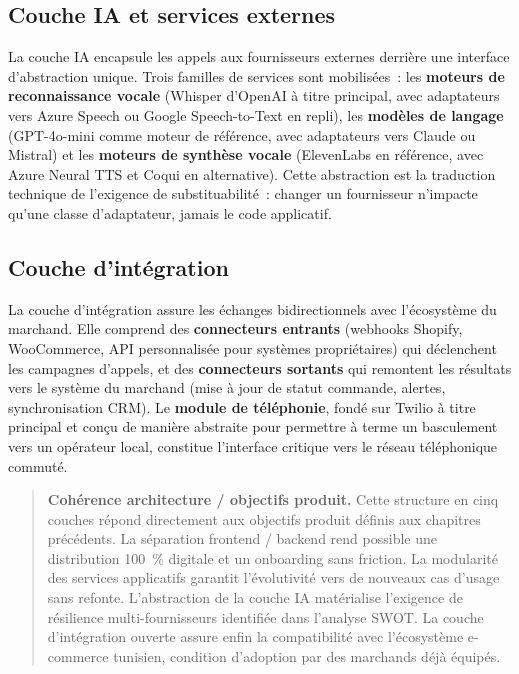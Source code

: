 \subsection{Couche IA et services externes}
\label{subsec:couche_ia_externes}

La couche IA encapsule les appels aux fournisseurs externes derrière une interface d'abstraction unique. Trois familles de services sont mobilisées~: les \textbf{moteurs de reconnaissance vocale} (Whisper d'OpenAI à titre principal, avec adaptateurs vers Azure Speech ou Google Speech-to-Text en repli), les \textbf{modèles de langage} (GPT-4o-mini comme moteur de référence, avec adaptateurs vers Claude ou Mistral) et les \textbf{moteurs de synthèse vocale} (ElevenLabs en référence, avec Azure Neural TTS et Coqui en alternative). Cette abstraction est la traduction technique de l'exigence de substituabilité~: changer un fournisseur n'impacte qu'une classe d'adaptateur, jamais le code applicatif.

\subsection{Couche d'intégration}
\label{subsec:couche_integration}

La couche d'intégration assure les échanges bidirectionnels avec l'écosystème du marchand. Elle comprend des \textbf{connecteurs entrants} (webhooks Shopify, WooCommerce, API personnalisée pour systèmes propriétaires) qui déclenchent les campagnes d'appels, et des \textbf{connecteurs sortants} qui remontent les résultats vers le système du marchand (mise à jour de statut commande, alertes, synchronisation CRM). Le \textbf{module de téléphonie}, fondé sur Twilio à titre principal et conçu de manière abstraite pour permettre à terme un basculement vers un opérateur local, constitue l'interface critique vers le réseau téléphonique commuté.

\begin{quote}
\textbf{Cohérence architecture / objectifs produit.} Cette structure en cinq couches répond directement aux objectifs produit définis aux chapitres précédents. La séparation frontend / backend rend possible une distribution 100~\% digitale et un onboarding sans friction. La modularité des services applicatifs garantit l'évolutivité vers de nouveaux cas d'usage sans refonte. L'abstraction de la couche IA matérialise l'exigence de résilience multi-fournisseurs identifiée dans l'analyse SWOT. La couche d'intégration ouverte assure enfin la compatibilité avec l'écosystème e-commerce tunisien, condition d'adoption par des marchands déjà équipés.
\end{quote}

